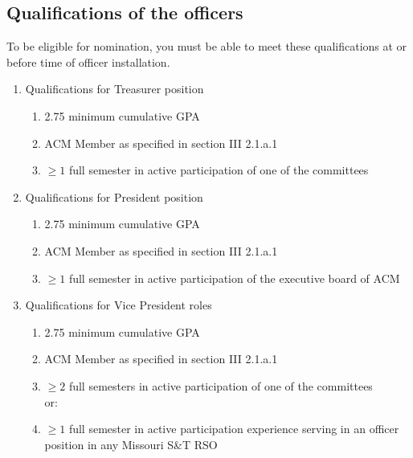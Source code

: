   \subsection{Qualifications of the officers}
    To be eligible for nomination, you must be able to meet these qualifications at or before
    time of officer installation.
    \begin{enumerate}[label=\arabic*.]
      \item Qualifications for Treasurer position
        \begin{enumerate}[label=\arabic*.]
          \item 2.75 minimum cumulative GPA
          \item ACM Member as specified in section III 2.1.a.1
          \item $\geq{1}$ full semester in active participation of one of the
          committees
        \end{enumerate}
      \item Qualifications for President position
        \begin{enumerate}[label=\arabic*.]
          \item 2.75 minimum cumulative GPA
          \item ACM Member as specified in section III 2.1.a.1
          \item $\geq{1}$ full semester in active participation of the executive
          board of ACM
        \end{enumerate}
      \item Qualifications for Vice President roles
        \begin{enumerate}[label=\arabic*.]
          \item 2.75 minimum cumulative GPA
          \item ACM Member as specified in section III 2.1.a.1
          \item $\geq{2}$ full semesters in active participation of one of the
          committees\\
          or:
          \item $\geq{1}$ full semester in active participation experience
          serving in an officer position in any Missouri S\&T RSO
        \end{enumerate}
    \end{enumerate}
 
